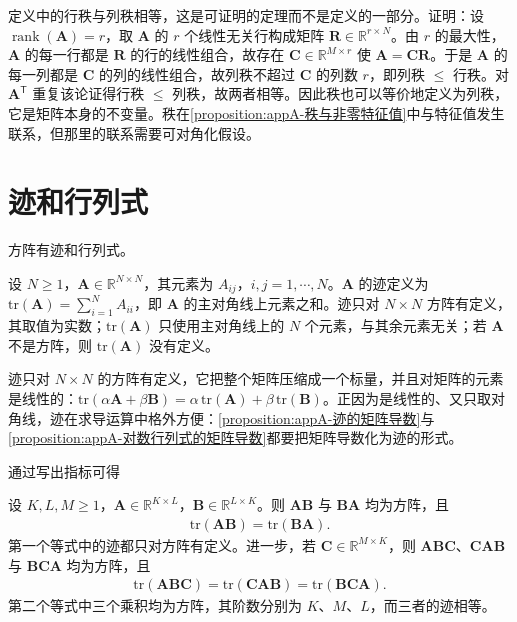 \documentclass[../main.tex]{subfiles}
\begin{document}
\begin{remark}
定义中的行秩与列秩相等，这是可证明的定理而不是定义的一部分。证明：设 $\operatorname{rank}(\bm{A})=r$，取 $\bm{A}$ 的 $r$ 个线性无关行构成矩阵 $\bm{R}\in\mathbb{R}^{r\times N}$。由 $r$ 的最大性，$\bm{A}$ 的每一行都是 $\bm{R}$ 的行的线性组合，故存在 $\bm{C}\in\mathbb{R}^{M\times r}$ 使 $\bm{A}=\bm{C}\bm{R}$。于是 $\bm{A}$ 的每一列都是 $\bm{C}$ 的列的线性组合，故列秩不超过 $\bm{C}$ 的列数 $r$，即列秩 $\leqslant$ 行秩。对 $\bm{A}^{\mathsf{T}}$ 重复该论证得行秩 $\leqslant$ 列秩，故两者相等。因此秩也可以等价地定义为列秩，它是矩阵本身的不变量。秩在\cref{proposition:appA-秩与非零特征值}中与特征值发生联系，但那里的联系需要可对角化假设。
\end{remark}

\section{迹和行列式}\label{section:appA-迹和行列式}

方阵有迹和行列式。

\begin{definition}[迹]\label{definition:appA-迹}
设 $N\geqslant1$，$\bm{A}\in\mathbb{R}^{N\times N}$，其元素为 $A_{ij}$，$i,j=1,\cdots,N$。$\bm{A}$ 的迹定义为 $\mathrm{tr}(\bm{A})=\sum_{i=1}^{N}A_{ii}$，即 $\bm{A}$ 的主对角线上元素之和。迹只对 $N\times N$ 方阵有定义，其取值为实数；$\mathrm{tr}(\bm{A})$ 只使用主对角线上的 $N$ 个元素，与其余元素无关；若 $\bm{A}$ 不是方阵，则 $\mathrm{tr}(\bm{A})$ 没有定义。
\end{definition}

\begin{remark}
迹只对 $N\times N$ 的方阵有定义，它把整个矩阵压缩成一个标量，并且对矩阵的元素是线性的：$\mathrm{tr}(\alpha\bm{A}+\beta\bm{B})=\alpha\,\mathrm{tr}(\bm{A})+\beta\,\mathrm{tr}(\bm{B})$。正因为是线性的、又只取对角线，迹在求导运算中格外方便：\cref{proposition:appA-迹的矩阵导数}与\cref{proposition:appA-对数行列式的矩阵导数}都要把矩阵导数化为迹的形式。
\end{remark}

通过写出指标可得
\begin{proposition}[迹的循环性]\label{proposition:appA-迹的循环性}
设 $K,L,M\geqslant1$，$\bm{A}\in\mathbb{R}^{K\times L}$，$\bm{B}\in\mathbb{R}^{L\times K}$。则 $\bm{A}\bm{B}$ 与 $\bm{B}\bm{A}$ 均为方阵，且
\begin{align}
  \mathrm{tr}(\bm{A}\bm{B})=\mathrm{tr}(\bm{B}\bm{A}).
  \label{align:appA-迹交换}
\end{align}
第一个等式中的迹都只对方阵有定义。进一步，若 $\bm{C}\in\mathbb{R}^{M\times K}$，则 $\bm{A}\bm{B}\bm{C}$、$\bm{C}\bm{A}\bm{B}$ 与 $\bm{B}\bm{C}\bm{A}$ 均为方阵，且
\begin{align}
  \mathrm{tr}(\bm{A}\bm{B}\bm{C})=\mathrm{tr}(\bm{C}\bm{A}\bm{B})=\mathrm{tr}(\bm{B}\bm{C}\bm{A}).
  \label{align:appA-迹循环}
\end{align}
第二个等式中三个乘积均为方阵，其阶数分别为 $K$、$M$、$L$，而三者的迹相等。
\end{proposition}
\end{document}
